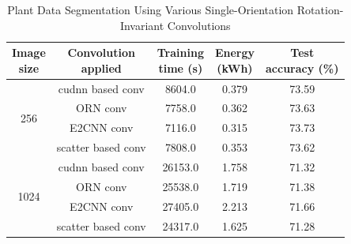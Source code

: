 
\begin{table}[ht]
\centering
\caption{Plant Data Segmentation Using Various Single-Orientation Rotation-Invariant Convolutions}
\renewcommand{\arraystretch}{1.2}
\begin{tabular}{c|c|c|c|c} 
\hline\hline
\shortstack{Image\\size} & 
\shortstack{Convolution\\applied} & 
\shortstack{Training\\time (s)} &  
\shortstack{Energy\\(kWh)} &  
\shortstack{Test\\accuracy (\%)} \\ 
\hline\hline
\multirow{4}{*}{256} 
 & cudnn based conv    & 8604.0  & 0.379  &73.59  \\ \cline{2-5}
 & ORN conv            & 7758.0  & 0.362  &73.63  \\ \cline{2-5}
 & E2CNN conv          & 7116.0  & 0.315  & 73.73 \\ \cline{2-5}
 & scatter based conv  & 7808.0  & 0.353  &73.62  \\
\hline

\multirow{4}{*}{1024} 
 & cudnn based conv    & 26153.0 & 1.758  &71.32  \\ \cline{2-5}
 & ORN conv            & 25538.0 & 1.719  &71.38  \\ \cline{2-5}
 & E2CNN conv          & 27405.0 & 2.213  &71.66  \\ \cline{2-5}
 & scatter based conv  & 24317.0 & 1.625  &71.28  \\
\hline
\end{tabular}
\label{tab:single-plant}
\end{table}

